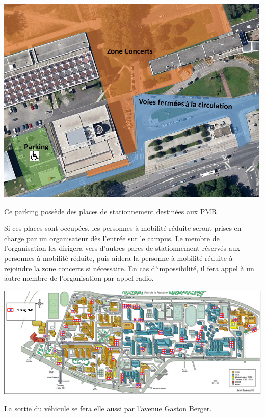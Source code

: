 \documentclass[hidelinks, paper=a4, fontsize=13pt]{report}
\begin{document}
\begin{center}
\includegraphics[width=\textwidth,keepaspectratio]{Annexes/Images/PMR_entree2}
\end{center}
Ce parking possède des places de stationnement destinées aux PMR.

Si ces places sont occupées, les personnes à mobilité réduite seront prises en charge par un organisateur dès l’entrée sur le campus. Le membre de l’organisation les dirigera vers d’autres parcs de stationnement réservés aux personnes à mobilité réduite, puis aidera la personne à mobilité réduite à rejoindre la zone concerts si nécessaire. En cas d’impossibilité, il fera appel à un autre membre de l’organisation par appel radio.

\begin{center}
\includegraphics[scale=1]{Annexes/Images/parkingPMRDOUA}
\end{center}

La sortie du véhicule se fera elle aussi par l'avenue Gaston Berger.
\end{document}
